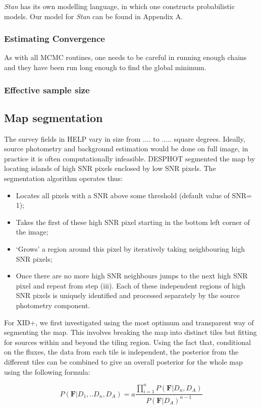 \documentclass[useAMS,usenatbib]{mn2e}
\begin{document}
\textit{Stan} has its own modelling language, in which one constructs probabilistic models. Our model for \textit{Stan} can be found in Appendix A.
\subsubsection{Estimating Convergence}
As with all MCMC routines, one needs to be careful in running enough chains and they have been run long enough to find the global minimum. 
\subsubsection{Effective sample size}


\subsection{Map segmentation}
The survey fields in HELP vary in size from .... to ..... square degrees. Ideally, source photometry and background estimation would be done on full image, in practice it is often computationally infeasible. DESPHOT segmented the map by locating islands of high SNR pixels enclosed by low SNR pixels. The segmentation algorithm operates thus:
\begin{itemize}
\item Locates all pixels with a SNR above some threshold (default value of SNR= 1);
\item Takes the first of these high SNR pixel starting in the bottom left corner of the image;
\item `Grows' a region around this pixel by iteratively taking neighbouring high SNR pixels;
\item Once there are no more high SNR neighbours jumps to the next high SNR pixel and repeat from step (iii).
Each of these independent regions of high SNR pixels is uniquely identified and processed separately by the source photometry component.
\end{itemize}

For XID+, we first investigated using the most optimum and transparent way of segmenting the map. This involves breaking the map into distinct tiles but fitting for sources within and beyond the tiling region. Using the fact that, conditional on the fluxes, the data from each tile is independent, the posterior from the different tiles can be combined to give an overall posterior for the whole map using the following formula:

\begin{equation}
P(\mathbf{F}|D_1,..D_n,D_A)=a\frac{\prod_{i=1}^n P(\mathbf{F}|D_n,D_A)}{P(\mathbf{F}|D_A)^{n-1}}
\end{equation}
\end{document}
